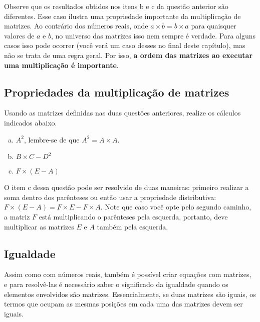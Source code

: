\documentclass[main_estudante.tex]{subfiles}
\begin{document}
Observe que os resultados obtidos nos itens b e c da questão anterior são diferentes. Esse caso ilustra uma propriedade importante da multiplicação de matrizes. Ao contrário dos números reais, onde $a \times b = b \times a$ para quaisquer valores de $a$ e $b$, no universo das matrizes isso nem sempre é verdade. Para alguns casos isso pode ocorrer (você verá um caso desses no final deste capítulo), mas não se trata de uma regra geral. Por isso, \textbf{a ordem das matrizes ao executar uma multiplicação é importante}.

\subsection*{Propriedades da multiplicação de matrizes}

\begin{questao}
Usando as matrizes definidas nas duas questões anteriores, realize os cálculos indicados abaixo.
\begin{enumerate}[a)]
\item $A^2$, lembre-se de que $A^2=A \times A$.
\item $B \times C - D^2$
\item $F \times (E-A)$ 
\end{enumerate}
\end{questao}

O item c dessa questão pode ser resolvido de duas maneiras: primeiro realizar a soma dentro dos parênteses ou então usar a propriedade distributiva: $F \times (E-A) = F \times E - F \times A$. Note que caso você opte pelo segundo caminho, a matriz $F$ está multiplicando o parênteses pela esquerda, portanto, deve multiplicar as matrizes $E$ e $A$ também pela esquerda.

\subsection*{Igualdade}

Assim como com números reais, também é possível criar equações com matrizes, e para resolvê-las  é necessário saber o significado da igualdade quando os elementos envolvidos são matrizes. Essencialmente, se duas matrizes são iguais, os termos que ocupam as mesmas posições em cada uma das matrizes devem ser iguais.
\end{document}
